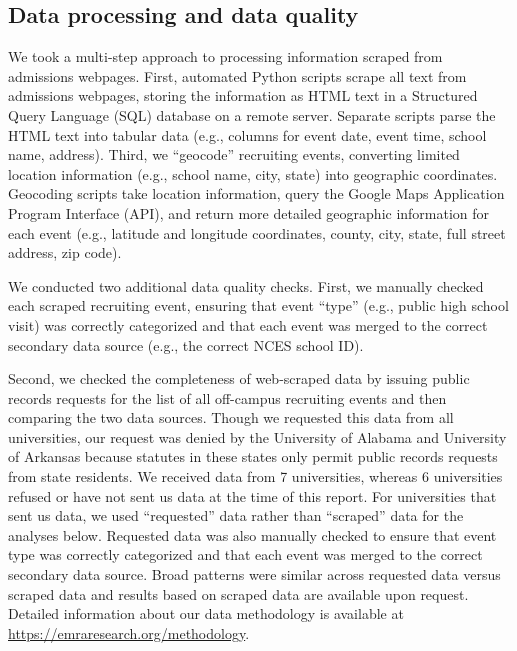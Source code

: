 \documentclass[twoside]{article}
\begin{document}

\subsection*{Data processing and data quality}

We took a multi-step approach to processing information scraped from admissions webpages. First, automated Python scripts scrape all text from admissions webpages, storing the information as HTML text in a Structured Query Language (SQL) database on a remote server. Separate scripts parse the HTML text into tabular data (e.g., columns for event date, event time, school name, address). Third, we ``geocode'' recruiting events, converting limited location information (e.g., school name, city, state) into geographic coordinates. Geocoding scripts take location information, query the Google Maps Application Program Interface (API), and return more detailed geographic information for each event (e.g., latitude and longitude coordinates, county, city, state, full street address, zip code).

We conducted two additional data quality checks. First, we manually checked each scraped recruiting event, ensuring that event ``type'' (e.g., public high school visit) was correctly categorized and that each event was merged to the correct secondary data source (e.g., the correct NCES school ID).

Second, we checked the completeness of web-scraped data by issuing public records requests for the list of all off-campus recruiting events and then comparing the two data sources. Though we requested this data from all universities, our request was denied by the University of Alabama and University of Arkansas because statutes in these states only permit public records requests from state residents. We received data from 7 universities, whereas 6 universities refused or have not sent us data at the time of this report. For universities that sent us data, we used ``requested'' data rather than ``scraped'' data for the analyses below. Requested data was also manually checked to ensure that event type was correctly categorized and that each event was merged to the correct secondary data source. Broad patterns were similar across requested data versus scraped data and results based on scraped data are available upon request. Detailed information about our data methodology is available at \href{https://emraresearch.org/methodology}{https://emraresearch.org/methodology}.
\end{document}
